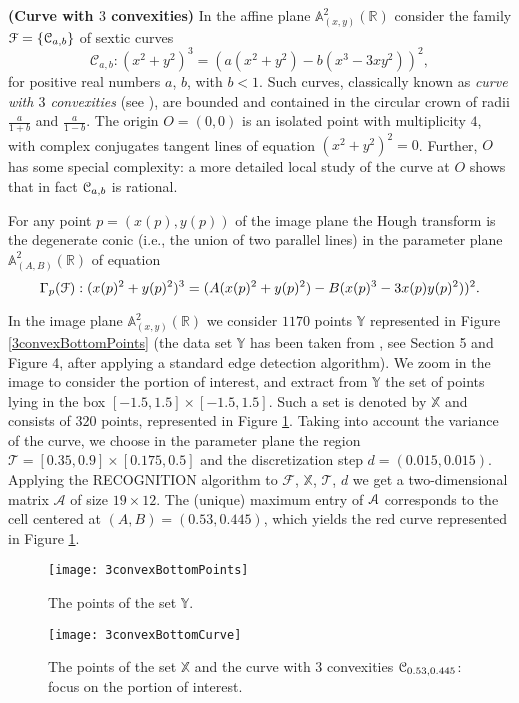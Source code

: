 \documentclass[10pt]{article}
\newcommand\sA{{\cal A}}
\newcommand\sC{{\cal C}}
\newcommand\sF{{\cal F}}
\newcommand\reals{{\mathbb R}}
\newtheorem{examp}[theorem]{Example}
\newenvironment{example*}{\begin{examp}\em}{\end{examp}}
\begin{document}
{\begin{example*}\label{3C}{\bf (Curve with $3$ convexities)}
In the affine plane ${\mathbb A}_{(x,y)}^2(\reals)$ consider the family 
$\sF=\{\mathcal{C}_{a,b}\}$ of sextic curves
  \begin{equation*}\label{3convex}
\mathcal{C}_{a,b}: (x^2+y^2)^3 = (a(x^2+y^2) - b(x^3-3xy^2))^2,
\end{equation*}
for positive real numbers $a$, $b$, with $b<1$. 
Such curves, classically known as {\em curve with $3$ convexities}
 (see \cite[p. 183]{atlas}),
are bounded and contained in the circular crown of radii $\frac{a}{1+b}$
and $\frac{a}{1-b}$.
The origin $O=(0,0)$ is an isolated point with multiplicity $4$, 
with complex conjugates  tangent lines of equation 
$(x^2+y^2)^2=0$. Further, $O$ has some special complexity:
a  more detailed local study of the curve at $O$ shows that in fact $\sC_{a,b}$ 
is rational.

For any point $p=(x(p), y(p))$ of the image plane the Hough transform is the  
degenerate conic (i.e., the union of two parallel lines) in the parameter plane $
{\mathbb A}_{(A,B)}^2(\reals)$ of equation
$$
\Gamma_p(\sF): (x(p)^2+y(p)^2)^3 = (A(x(p)^2+y(p)^2) - B(x(p)^3-3x(p)y(p)^2))^2.
$$

In the image plane ${\mathbb A}_{(x,y)}^2(\reals)$ we consider $1170$ points $\mathbb Y$ represented in Figure \ref{3convexBottomPoints} (the data set $\mathbb Y$  has been taken  from \cite{etal}, see Section 5 and Figure 4, after applying a standard edge detection algorithm). We zoom in the image to consider the portion
of interest, and extract from $\mathbb Y$ the set of points lying in the box $[-1.5,1.5] \times [-1.5,1.5]$.
Such a set  is denoted by $\mathbb X$ and consists of $320$ points,
represented in Figure \ref{3convexBottomCurve}.
Taking into account the variance of the curve, we choose in the parameter plane 
the region $\mathcal T =[0.35,0.9] \times [0.175,0.5] $
and the discretization step $d=(0.015, 0.015)$.
Applying the RECOGNITION algorithm to 
$\mathcal F$, $\mathbb X$, $\mathcal T$, $d$ we get a two-dimensional
matrix $\mathcal A$ of size $19 \times 12$.
The (unique) maximum entry of $\sA$ 
corresponds to the cell centered at  $(A,B) = (0.53,0.445)$,
which yields the red curve represented in Figure \ref{3convexBottomCurve}.


\begin{figure}[htb]
\centering
\begin{minipage}[c]{0.51\textwidth}
\texttt{[image: 3convexBottomPoints]}
\caption{\small{The points of the set $\mathbb Y$.}}\label{3convexBottomPoints}
\end{minipage}%
\hspace{0.29cm}
\begin{minipage}[c]{0.46\textwidth}
\texttt{[image: 3convexBottomCurve]}
\caption{\small{The points of the set $\mathbb X$ and the curve with $3$ convexities
$\sC_{0.53,0.445}$: focus on the portion of interest.}}\label{3convexBottomCurve}
\end{minipage}
\end{figure}



\end{example*}}
\end{document}
